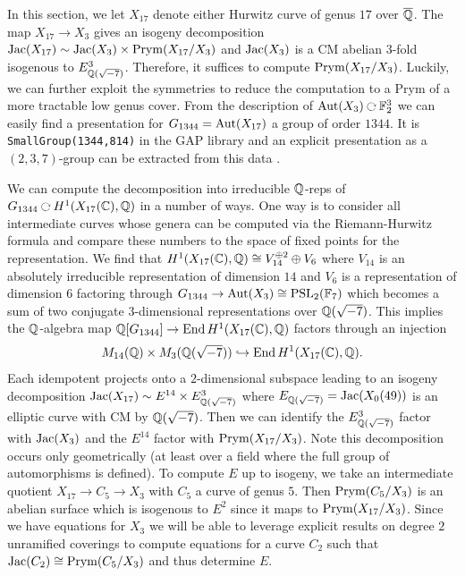 \documentclass[main.tex]{subfiles}
\begin{document}
In this section, we let $X_{17}$ denote either Hurwitz curve of genus $17$ over $\overline{\mathbb{Q}}$. The map $X_{17} \to X_3$ gives an isogeny decomposition $\operatorname{\mathrm{Jac}}(X_{17}) \sim \operatorname{\mathrm{Jac}}(X_3) \times \operatorname{\mathrm{Prym}}(X_{17} / X_3)$ and 
$\operatorname{\mathrm{Jac}}(X_3)$ is a CM abelian $3$-fold isogenous to $E_{\mathbb{Q}(\sqrt{-7})}^3$. Therefore, it suffices to compute $\operatorname{\mathrm{Prym}}(X_{17} / X_3)$. Luckily, we can further exploit the symmetries to reduce the computation to a Prym of a more tractable low genus cover. From the description of $\Aut(X_3) \acts \FF_2^3$ we can easily find a presentation for $G_{1344} = \operatorname{\mathrm{Aut}}(X_{17})$ a group of order $1344$. It is \texttt{SmallGroup(1344,814)} in the GAP library and an explicit presentation as a $(2,3,7)$-group can be extracted from this data \cite{Macbeath:eightfold, Conder:survey}.
\par 
We can compute the decomposition into irreducible $\mathbb{Q}$-reps of $G_{1344} \acts H^1(X_{17}(\CC), \Q)$ in a number of ways. One way is to consider all intermediate curves whose genera can be computed via the Riemann-Hurwitz formula and compare these numbers to the space of fixed points for the representation. We find that $H^1(X_{17}(\mathbb{C}), \mathbb{Q}) \cong V_{14}^{\oplus 2} \oplus V_6$ where $V_{14}$ is an absolutely irreducible representation of dimension $14$ and $V_6$ is a representation of dimension $6$ factoring through $G_{1344} \to \operatorname{\mathrm{Aut}}(X_3) \cong \mathrm{PSL}_2(\mathbb{F}_7)$ which becomes a sum of two conjugate $3$-dimensional representations over $\mathbb{Q}(\sqrt{-7})$. This implies the $\mathbb{Q}$-algebra map $\mathbb{Q}[G_{1344}] \to \operatorname{\mathrm{End}}{H^1(X_{17}(\mathbb{C}), \mathbb{Q})}$ factors through an injection
\[ M_{14}(\mathbb{Q}) \times M_3(\mathbb{Q}(\sqrt{-7})) \hookrightarrow \operatorname{\mathrm{End}}{H^1(X_{17}(\mathbb{C}), \mathbb{Q})}. \] 
Each idempotent projects onto a $2$-dimensional subspace leading to an isogeny decomposition $\operatorname{\mathrm{Jac}}(X_{17}) \sim E^{14} \times E_{\mathbb{Q}(\sqrt{-7})}^3$ where $E_{\mathbb{Q}(\sqrt{-7})} = \operatorname{\mathrm{Jac}}(X_0(49))$ is an elliptic curve with CM by $\mathbb{Q}(\sqrt{-7})$. Then we can identify the $E_{\mathbb{Q}(\sqrt{-7})}^3$ factor with $\operatorname{\mathrm{Jac}}(X_3)$ and the $E^{14}$ factor with $\operatorname{\mathrm{Prym}}(X_{17}/X_3)$. Note this decomposition occurs only geometrically (at least over a field where the full group of automorphisms is defined).
To compute $E$ up to isogeny, we take an intermediate quotient $X_{17} \to C_5 \to X_3$ with $C_5$ a curve of genus $5$. Then $\operatorname{\mathrm{Prym}}(C_5/X_3)$ is an abelian surface which is isogenous to $E^2$ since it maps to $\operatorname{\mathrm{Prym}}(X_{17}/X_3)$. Since we have equations for $X_3$ we will be able to leverage explicit results on degree $2$ unramified coverings to compute equations for a curve $C_2$ such that $\operatorname{\mathrm{Jac}}(C_2) \cong \operatorname{\mathrm{Prym}}(C_5/X_3)$ and thus determine $E$.
\end{document}
